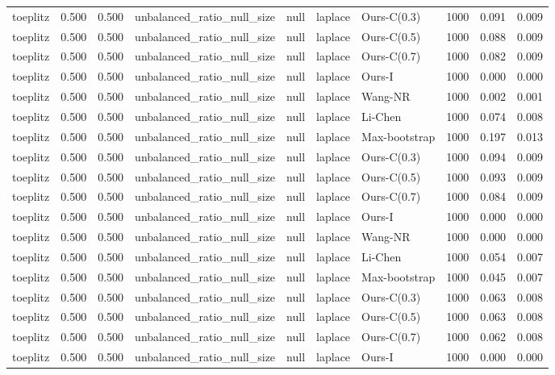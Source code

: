 \begin{tabular}{lrrllllrrr}
toeplitz & 0.500 & 0.500 & unbalanced\_ratio\_null\_size & null & laplace & Ours-C(0.3) & 1000 & 0.091 & 0.009 \\
toeplitz & 0.500 & 0.500 & unbalanced\_ratio\_null\_size & null & laplace & Ours-C(0.5) & 1000 & 0.088 & 0.009 \\
toeplitz & 0.500 & 0.500 & unbalanced\_ratio\_null\_size & null & laplace & Ours-C(0.7) & 1000 & 0.082 & 0.009 \\
toeplitz & 0.500 & 0.500 & unbalanced\_ratio\_null\_size & null & laplace & Ours-I & 1000 & 0.000 & 0.000 \\
toeplitz & 0.500 & 0.500 & unbalanced\_ratio\_null\_size & null & laplace & Wang-NR & 1000 & 0.002 & 0.001 \\
toeplitz & 0.500 & 0.500 & unbalanced\_ratio\_null\_size & null & laplace & Li-Chen & 1000 & 0.074 & 0.008 \\
toeplitz & 0.500 & 0.500 & unbalanced\_ratio\_null\_size & null & laplace & Max-bootstrap & 1000 & 0.197 & 0.013 \\
toeplitz & 0.500 & 0.500 & unbalanced\_ratio\_null\_size & null & laplace & Ours-C(0.3) & 1000 & 0.094 & 0.009 \\
toeplitz & 0.500 & 0.500 & unbalanced\_ratio\_null\_size & null & laplace & Ours-C(0.5) & 1000 & 0.093 & 0.009 \\
toeplitz & 0.500 & 0.500 & unbalanced\_ratio\_null\_size & null & laplace & Ours-C(0.7) & 1000 & 0.084 & 0.009 \\
toeplitz & 0.500 & 0.500 & unbalanced\_ratio\_null\_size & null & laplace & Ours-I & 1000 & 0.000 & 0.000 \\
toeplitz & 0.500 & 0.500 & unbalanced\_ratio\_null\_size & null & laplace & Wang-NR & 1000 & 0.000 & 0.000 \\
toeplitz & 0.500 & 0.500 & unbalanced\_ratio\_null\_size & null & laplace & Li-Chen & 1000 & 0.054 & 0.007 \\
toeplitz & 0.500 & 0.500 & unbalanced\_ratio\_null\_size & null & laplace & Max-bootstrap & 1000 & 0.045 & 0.007 \\
toeplitz & 0.500 & 0.500 & unbalanced\_ratio\_null\_size & null & laplace & Ours-C(0.3) & 1000 & 0.063 & 0.008 \\
toeplitz & 0.500 & 0.500 & unbalanced\_ratio\_null\_size & null & laplace & Ours-C(0.5) & 1000 & 0.063 & 0.008 \\
toeplitz & 0.500 & 0.500 & unbalanced\_ratio\_null\_size & null & laplace & Ours-C(0.7) & 1000 & 0.062 & 0.008 \\
toeplitz & 0.500 & 0.500 & unbalanced\_ratio\_null\_size & null & laplace & Ours-I & 1000 & 0.000 & 0.000 \\

\end{tabular}
